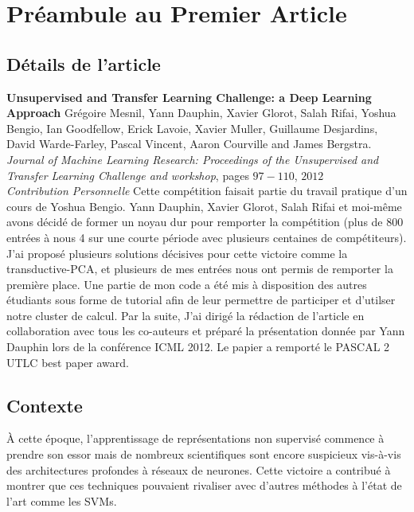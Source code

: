 \chapter{Pr\'{e}ambule au Premier Article }

\section{D\'{e}tails de l'article}

{\bf Unsupervised and Transfer Learning Challenge: a Deep Learning Approach}
Gr\'{e}goire Mesnil, Yann Dauphin, Xavier Glorot, Salah Rifai, Yoshua Bengio,
Ian Goodfellow, Erick Lavoie, Xavier Muller, Guillaume Desjardins, David
Warde-Farley, Pascal Vincent, Aaron Courville and James Bergstra. {\it Journal
of Machine Learning Research: Proceedings of the Unsupervised and Transfer
Learning Challenge and workshop}, pages $97-110$, $2012$ \\

{\it Contribution Personnelle} Cette comp\'{e}tition faisait partie du travail
pratique d'un cours de Yoshua Bengio. Yann Dauphin, Xavier Glorot, Salah Rifai
et moi-m\^{e}me avons d\'{e}cid\'{e} de former un noyau dur pour remporter la
comp\'{e}tition (plus de 800 entr\'{e}es \`{a} nous 4 sur une courte
p\'{e}riode avec plusieurs centaines de comp\'{e}titeurs).  J'ai propos\'{e}
plusieurs solutions d\'{e}cisives pour cette victoire comme la
transductive-PCA, et plusieurs de mes entr\'{e}es nous ont permis de remporter
la premi\`{e}re place. Une partie de mon code a \'{e}t\'{e} mis \`{a}
disposition des autres \'{e}tudiants sous forme de tutorial afin de leur
permettre de participer et d'utilser notre cluster de calcul. Par la suite,
J'ai dirig\'{e} la r\'{e}daction de l'article en collaboration avec tous les
co-auteurs et pr\'{e}par\'{e} la pr\'{e}sentation donn\'{e}e par Yann Dauphin
lors de la conf\'{e}rence ICML 2012. Le papier a remport\'{e} le PASCAL 2 UTLC
best paper award. 

\section{Contexte}

\`{A} cette \'{e}poque, l'apprentissage de repr\'{e}sentations non
supervis\'{e} commence \`{a} prendre son essor mais de nombreux scientifiques
sont encore suspicieux vis-\`{a}-vis des architectures profondes à réseaux de
neurones. Cette victoire a contribu\'{e} \`{a} montrer que ces techniques
pouvaient rivaliser avec d'autres m\'{e}thodes \`{a} l'\'{e}tat de l'art comme
les SVMs.

